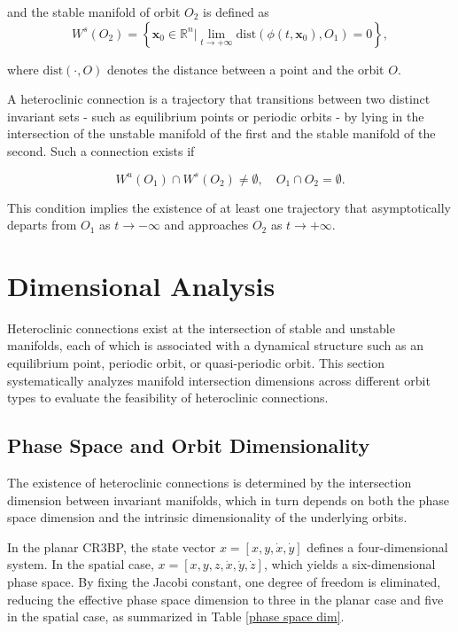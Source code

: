 \documentclass[JESA]{tjsass} %
\begin{document}
and the stable manifold of orbit $O_2$ is defined as
 \begin{equation}
     W^s(O_2) = \left \{ \mathbf{x}_0 \in \mathbb{R}^n | \lim_{t \to +\infty} \text{dist} (\phi(t, \mathbf{x}_0), O_1) = 0 \right\},
 \end{equation}

 where $\text{dist}(\cdot,O)$ denotes the distance between a point and the orbit $O$.

 A heteroclinic connection is a trajectory that transitions between two distinct invariant sets - such as equilibrium points or periodic orbits - by lying in the intersection of the unstable manifold of the first and the stable manifold of the second. Such a connection exists if

 \begin{equation}
     W^u(O_1) \cap W^s(O_2) \neq \emptyset, \quad O_1 \cap O_2 = \emptyset.
 \end{equation}

 This condition implies the existence of at least one trajectory that asymptotically departs from $O_1$ as $t \to -\infty$ and approaches $O_2$ as $t \to +\infty$.\cite{wiggins1992}

\section{Dimensional Analysis}
\label{dimensional Analysis}

Heteroclinic connections exist at the intersection of stable and unstable manifolds, each of which is associated with a dynamical structure such as an equilibrium point, periodic orbit, or quasi-periodic orbit. This section systematically analyzes manifold intersection dimensions across different orbit types to evaluate the feasibility of heteroclinic connections.

\subsection{Phase Space and Orbit Dimensionality}

The existence of heteroclinic connections is determined by the intersection dimension between invariant manifolds, which in turn depends on both the phase space dimension and the intrinsic dimensionality of the underlying orbits.

In the planar CR3BP, the state vector $x = [x,y,\dot{x},\dot{y}]$ defines a four-dimensional system. In the spatial case, $x = [x,y,z,\dot{x},\dot{y},\dot{z}]$, which yields a six-dimensional phase space. By fixing the Jacobi constant, one degree of freedom is eliminated, reducing the effective phase space dimension to three in the planar case and five in the spatial case, as summarized in Table \ref{phase space dim}.
\end{document}

